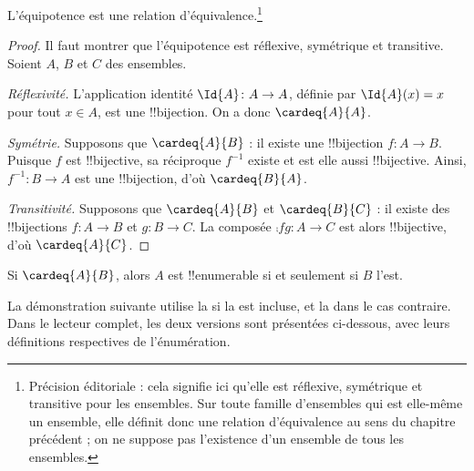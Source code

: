 \documentclass[11pt,a4paper,openany]{memoir}
\begin{document}
\begin{prop}
L'équipotence est une relation d'équivalence.\footnote{Précision
éditoriale : cela signifie ici qu'elle est réflexive, symétrique et
transitive pour les ensembles. Sur toute famille d'ensembles qui est
elle-même un ensemble, elle définit donc une relation d'équivalence
au sens du chapitre précédent ; on ne suppose pas l'existence d'un
ensemble de tous les ensembles.}
\end{prop}

\begin{proof}
Il faut montrer que l'équipotence est réflexive, symétrique et
transitive. Soient $A$, $B$ et $C$ des ensembles.

\emph{Réflexivité.} L'application identité $\Id{A} \colon A \to A$,
définie par $\Id{A}(x) = x$ pour tout $x \in A$, est une
!!{bijection}. On a donc $\cardeq{A}{A}$.

\emph{Symétrie.} Supposons que $\cardeq{A}{B}$ : il existe une
!!{bijection} $f\colon A \to B$. Puisque $f$ est !!{bijective},
sa réciproque $f^{-1}$ existe et est elle aussi !!{bijective}.
Ainsi, $f^{-1}\colon B \to A$ est une !!{bijection}, d'où
$\cardeq{B}{A}$.

\emph{Transitivité.} Supposons que $\cardeq{A}{B}$ et
$\cardeq{B}{C}$ : il existe des !!{bijection}s $f\colon A \to B$
et $g\colon B \to C$. La composée $\comp{f}{g}\colon A \to C$
est alors !!{bijective}, d'où $\cardeq{A}{C}$.
\end{proof}

\begin{prop}
Si $\cardeq{A}{B}$, alors $A$ est !!{enumerable} si et seulement si
$B$ l'est.
\end{prop}

\begin{editorial}
La démonstration suivante utilise la 
si la  est incluse, et la
 dans le cas contraire.
Dans le lecteur complet, les deux versions sont présentées ci-dessous,
avec leurs définitions respectives de l'énumération.
\end{editorial}
\end{document}
